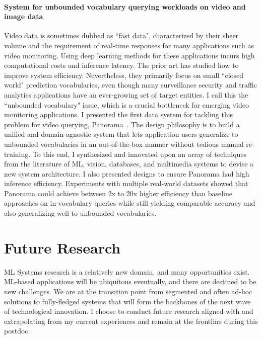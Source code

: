\documentclass[letterpaper]{article}
\begin{document}
\paragraph{System for unbounded vocabulary querying workloads on video and image data} Video data is sometimes dubbed as ``fast data", characterized by their sheer volume and the requirement of real-time responses for many applications such as video monitoring. Using deep learning methods for these applications incurs high computational costs and inference latency. The prior art has studied how to improve system efficiency. Nevertheless, they primarily focus on small ``closed world" prediction vocabularies, even though many surveillance security and traffic analytics applications have an ever-growing set of target entities. I call this the ``unbounded vocabulary" issue, which is a crucial bottleneck for emerging video monitoring applications. I presented the first data system for tackling this problem for video querying, Panorama~\cite{panorama}. The design philosophy
is to build a unified and domain-agnostic system that lets
application users generalize to unbounded vocabularies in an
out-of-the-box manner without tedious manual re-training.
To this end, I synthesized and innovated upon an array of
techniques from the literature of ML, vision, databases, and multimedia systems to devise a new system architecture.
I also presented designs to ensure Panorama had high
inference efficiency. Experiments with multiple real-world
datasets showed that Panorama could achieve between 2x to 20x
higher efficiency than baseline approaches on in-vocabulary
queries while still yielding comparable accuracy and also
generalizing well to unbounded vocabularies.


\section*{Future Research}
ML Systems research is a relatively new domain, and many opportunities exist. ML-based applications will be ubiquitous eventually, and there are destined to be new challenges. We are at the transition point from segmented and often ad-hoc solutions to fully-fledged systems that will form the backbones of the next wave of technological innovation. I choose to conduct future research aligned with and extrapolating from my current experiences and remain at the frontline during this postdoc.
\end{document}
